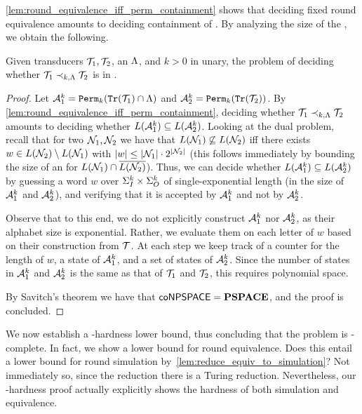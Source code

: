 \autoref{lem:round_equivalence_iff_perm_containment} shows that deciding fixed round equivalence amounts to deciding containment of \NFAs. By analyzing the size of the \NFAs, we obtain the following.
\begin{theorem}
	\label{thm:fixed_re_PSPACE}
	Given transducers $\mathcal{T}_1,\mathcal{T}_2$, an \NFA $\Lambda$, and $k>0$ in unary, the problem of deciding whether $\mathcal{T}_1\prec_{k,\Lambda}\mathcal{T}_2$ is in \PSPACE.
\end{theorem}
\begin{proof}
	Let $\mathcal{A}_1^k={\mathtt{Perm}}_k({\mathtt{Tr}}(\mathcal{T}_1)\cap \Lambda)$ and $\mathcal{A}_2^k={\mathtt{Perm}}_k({\mathtt{Tr}}(\mathcal{T}_2))$. By \autoref{lem:round_equivalence_iff_perm_containment}, deciding whether $\mathcal{T}_1\prec_{k,\Lambda} \mathcal{T}_2$ amounts to deciding whether $L(\mathcal{A}^k_1)\subseteq L(\mathcal{A}^k_2)$. Looking at the dual problem, recall that for two \NFAs $\mathcal{N}_1, \mathcal{N}_2$ we have that $L(\mathcal{N}_1)\not\subseteq L(\mathcal{N}_2)$ iff 
	there exists $w\in L(\mathcal{N}_2)\setminus L(\mathcal{N}_1)$ with $|w|\le |\mathcal{N}_1|\cdot 2^{|\mathcal{N}_2|}$ (this follows immediately by bounding the size of an \NFA for $L(\mathcal{N}_1)\cap \overline{L(\mathcal{N}_2)}$). Thus, we can decide whether $L(\mathcal{A}^k_1)\subseteq L(\mathcal{A}^k_2)$ by guessing a word $w$ over $\Sigma_{I}^k\times \Sigma_{O}^k$ of single-exponential length (in the size of $\mathcal{A}^k_1$ and $\mathcal{A}^k_2$), and verifying that it is accepted by $\mathcal{A}^k_1$ and not by $\mathcal{A}^k_2$. 
	
	Observe that to this end, we do not explicitly construct $\mathcal{A}^k_1$ nor $\mathcal{A}^k_2$, as their alphabet size is exponential. Rather, we evaluate them on each letter of $w$ based on their construction from $\mathcal{T}$. At each step we keep track of a counter for the length of $w$, a state of $\mathcal{A}^k_1$, and a set of states of $\mathcal{A}^k_2$. Since the number of states in $\mathcal{A}^k_1$ and $\mathcal{A}^k_2$ is the same as that of $\mathcal{T}_1$ and $\mathcal{T}_2$, this requires polynomial space.
	
	By Savitch's theorem we have that $\mathsf{coNPSPACE}=\textbf{PSPACE}$, and the proof is concluded.
\end{proof}

We now establish a \PSPACE-hardness lower bound, thus concluding that the problem is \PSPACE-complete. In fact, we show a lower bound for round equivalence. Does this entail a lower bound for round simulation by~\autoref{lem:reduce_equiv_to_simulation}? Not immediately so, since the reduction there is a Turing reduction. Nevertheless, our \PSPACE-hardness proof actually explicitly shows the hardness of both simulation and equivalence.

